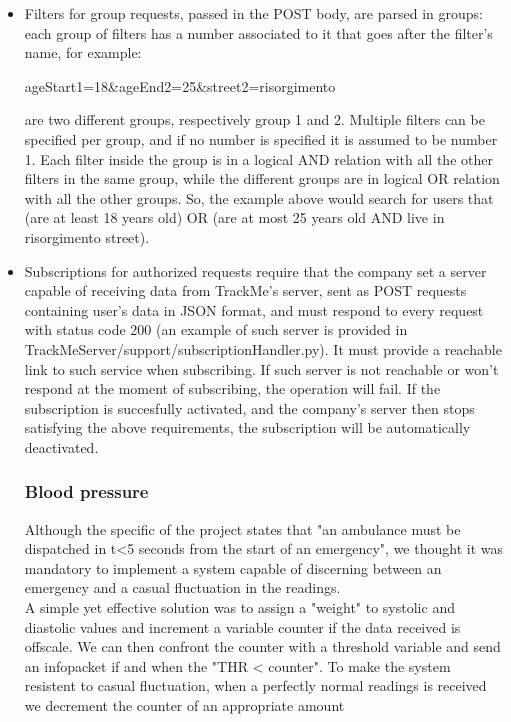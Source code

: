 \documentclass[../main.tex]{subfiles}
\begin{document}
\begin{itemize}

	\item Filters for group requests, passed in the POST body, are parsed in groups: each group of filters has a number associated to it that goes after the filter's name, for example:

	 ageStart1=18\&ageEnd2=25\&street2=risorgimento

	 are two different groups, respectively group 1 and 2. Multiple filters can be specified per group, and if no number is specified it is assumed to be number 1. Each filter inside the group is in a logical AND relation with all the other filters in the same group, while the different groups are in logical OR relation with all the other groups. So, the example above would search for users that (are at least 18 years old) OR (are at most 25 years old AND live in risorgimento street).
	\item Subscriptions for authorized requests require that the company set a server capable of receiving data from TrackMe's server, sent as POST requests containing user's data in JSON format, and must respond to every request with status code 200 (an example of such server is provided in TrackMeServer/support/subscriptionHandler.py). It must provide a reachable link to such service when subscribing. If such server is not reachable or won't respond at the moment of subscribing, the operation will fail. If the subscription is succesfully activated, and the company's server then stops satisfying the above requirements, the subscription will be automatically deactivated.

	\subsubsection{Blood pressure}
	Although the specific of the project states that "an ambulance must be dispatched in t<5 seconds from the start of an emergency",
	we thought it was mandatory to implement a system capable of discerning between an emergency and a casual fluctuation in the readings.\\
	A simple yet effective solution was to assign a "weight" to systolic and diastolic values and increment a variable counter if the data received is offscale.
	We can then confront the counter with a threshold variable and send an infopacket if and when the "THR < counter". To make the system resistent to casual fluctuation,
	when a perfectly normal readings is received we decrement the counter of an appropriate amount


\end{itemize}
\end{document}
